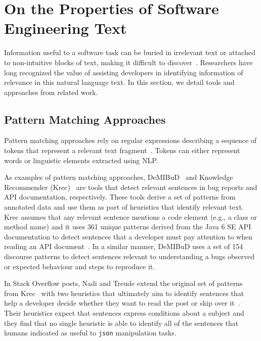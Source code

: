 


\section{On the Properties of Software Engineering Text}
\label{cp2:text-properties}



Information useful to a software task can be buried in irrelevant text or attached to 
non-intuitive blocks of text, making it difficult to discover~\cite{Robillard2015}.
Researchers have long recognized the value of assisting developers in 
identifying information of relevance in this natural language
text.
In this section, we detail tools and approaches from related work.




\subsection{Pattern Matching Approaches}


Pattern matching approaches rely on regular expressions describing a sequence of tokens that represent a relevant text fragment~\cite{Bavota2016}. Tokens can either represent words or linguistic elements 
extracted using \acf{NLP}.
    
    
As examples  of pattern matching approaches,  {\small DeMIBuD}~\cite{Chaparro2017} and Knowledge Recommender (Krec)~\cite{Maalej2013, Robillard2015} are tools that detect relevant sentences in bug reports and API documentation, respectively. 
These tools derive a set of patterns from annotated data and use them as part of heuristics 
that identify relevant text. Krec assumes that any relevant sentence mentions a 
code element (e.g., a class or method name) and it uses  361 unique patterns derived from the Java 6 SE API documentation to 
detect sentences that a developer must pay attention to when reading an API document~\cite{Robillard2015}.
In a similar manner, {\small DeMIBuD} uses a set of 154 discourse patterns to detect sentences 
relevant to understanding a bugs observed or expected behaviour and steps to reproduce it.





In  Stack Overflow posts, Nadi and Treude  extend the original set of patterns from Krec~\cite{Robillard2015} with two heuristics that ultimately aim to identify sentences that help a developer decide whether they want to read the post or skip over it~\cite{nadi2020}. 
Their heuristics expect that sentences express conditions about a subject and 
they find that no single heuristic is able to identify all of the sentences 
that humans indicated as useful to \texttt{json} manipulation tasks. 







